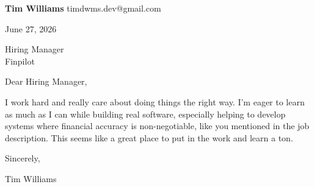 \documentclass[12pt]{article}
\begin{document}
\textbf{Tim Williams} \hfill timdwms.dev@gmail.com

\vspace{1em}

June 27, 2026

\vspace{1em}

Hiring Manager \\
Finpilot

\vspace{1em}

Dear Hiring Manager,

I work hard and really care about doing things the right way. I'm eager to learn as much as I can while building real software, especially helping to develop systems where financial accuracy is non-negotiable, like you mentioned in the job description. This seems like a great place to put in the work and learn a ton.

\vspace{1em}

Sincerely,

\vspace{2em}

Tim Williams
\end{document}
